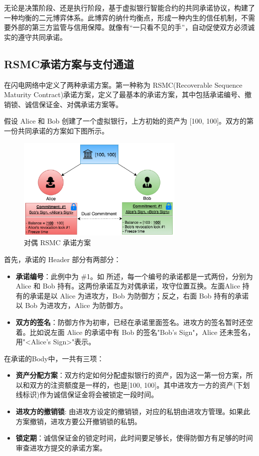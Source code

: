 无论是决策阶段、还是执行阶段，基于虚拟银行智能合约的共同承诺协议，构建了一种均衡的二元博弈体系。此博弈的纳什均衡点，形成一种内生的信任机制，不需要外部的第三方监管与信用保障。就像有“一只看不见的手”，自动促使双方必须诚实的遵守共同承诺。

\subsection{RSMC承诺方案与支付通道}
在闪电网络中定义了两种承诺方案。第一种称为 RSMC(Recoverable Sequence Maturity Contract)承诺方案，定义了最基本的承诺方案，其中包括承诺编号、撤销锁、诚信保证金、对偶承诺方案等。

假设 Alice 和 Bob 创建了一个虚拟银行，上方初始的资产为 [100, 100]。双方的第一份共同承诺的方案如下图所示。
\begin{figure}[h!]
    \centering
    \includegraphics[width=8cm, keepaspectratio]{../images/rsmc_1.png}
    \caption{对偶 RSMC 承诺方案}
    \label{fig:rsmc_1}
\end{figure}

首先，承诺的 Header 部分有两部分：
\begin{itemize}
    \item \textbf{承诺编号}：此例中为 \#1。如 所述，每一个编号的承诺都是一式两份，分别为 Alice 和 Bob 持有。这两份承诺互为对偶承诺，攻守位置互换。左面Alice 持有的承诺是以 Alice 为进攻方，Bob 为防御方；反之，右面 Bob 持有的承诺以 Bob 为进攻方，Alice 为防御方。
    \item \textbf{双方的签名}：防御方作为初审，已经在承诺里面签名。进攻方的签名暂时还空着。比如说左面 Alice 的承诺中有 Bob 的签名"Bob's Sign"，Alice 还未签名，用"<Alice's Sign>"表示。
\end{itemize}

在承诺的Body中，一共有三项：

\begin{itemize}
    \item \textbf{资产分配方案}：双方约定如何分配虚拟银行的资产，因为这一第一份方案，所以和双方的注资额度是一样的，也是[100, 100]。其中进攻方一方的资产(下划线标识)作为诚信保证金将会被锁定一段时间。
    \item \textbf{进攻方的撤销锁}: 由进攻方设定的撤销锁，对应的私钥由进攻方管理。如果此方案撤销，进攻方要公开撤销锁的私钥。
    \item \textbf{锁定期}：诚信保证金的锁定时间，此时间要足够长，使得防御方有足够的时间审查进攻方提交的承诺方案。
\end{itemize}


